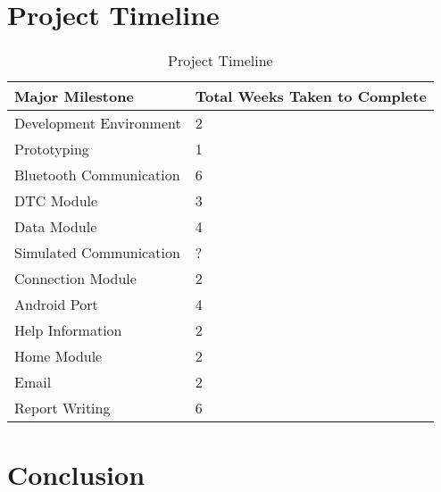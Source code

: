 {\section{Project Timeline}
	\paragraph{}{
	}
	\begin{table}[ht]		
			\begin{center}				
				\begin{tabularx}{\textwidth}{| X | l |}								
				\hline
				\textbf{Major Milestone} & \textbf{Total Weeks Taken to Complete}\\
				\hline				
				Development Environment & 2\\
				\hline
				Prototyping & 1\\
				\hline
				Bluetooth Communication & 6\\
				\hline
				DTC Module & 3\\
				\hline
				Data Module & 4\\
				\hline				
				Simulated Communication & ?\\
				\hline
				Connection Module & 2\\
				\hline
				Android Port & 4\\
				\hline
				Help Information & 2\\
				\hline
				Home Module & 2\\
				\hline
				Email & 2\\
				\hline
				Report Writing & 6 \\
				\hline
				\end{tabularx}
				\caption{Project Timeline}
				\label{tab:ProjectTimeLine}
			\end{center}
	\end{table}
	
\section{Conclusion}
}
